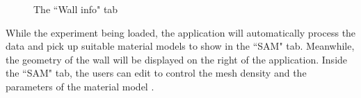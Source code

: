 \begin{figure}[!htbp]
  \caption{The ``Wall info" tab}
  \label{fig:bim}
\end{figure}

While the experiment being loaded, the application will automatically process the data and pick up suitable material models to show in the ``SAM" tab.
Meanwhile, the geometry of the wall will be displayed on the right of the application.
Inside the ``SAM" tab, the users can edit to control the mesh density and the parameters of the material model . 


